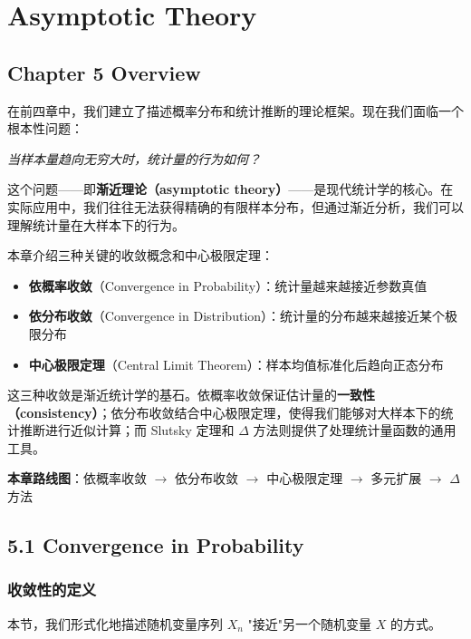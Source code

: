 \chapter{Asymptotic Theory}\label{chap:asymptotic-theory}

\section*{Chapter 5 Overview}

在前四章中，我们建立了描述概率分布和统计推断的理论框架。现在我们面临一个根本性问题：

\begin{center}
\textit{当样本量趋向无穷大时，统计量的行为如何？}
\end{center}

这个问题——即\textbf{渐近理论（asymptotic theory）}——是现代统计学的核心。在实际应用中，我们往往无法获得精确的有限样本分布，但通过渐近分析，我们可以理解统计量在大样本下的行为。

本章介绍三种关键的收敛概念和中心极限定理：

\begin{itemize}
\item \textbf{依概率收敛}（Convergence in Probability）：统计量越来越接近参数真值
\item \textbf{依分布收敛}（Convergence in Distribution）：统计量的分布越来越接近某个极限分布
\item \textbf{中心极限定理}（Central Limit Theorem）：样本均值标准化后趋向正态分布
\end{itemize}

这三种收敛是渐近统计学的基石。依概率收敛保证估计量的\textbf{一致性（consistency）}；依分布收敛结合中心极限定理，使得我们能够对大样本下的统计推断进行近似计算；而 Slutsky 定理和 $\Delta$ 方法则提供了处理统计量函数的通用工具。

\textbf{本章路线图}：依概率收敛 $\to$ 依分布收敛 $\to$ 中心极限定理 $\to$ 多元扩展 $\to$ $\Delta$ 方法

\section{5.1 Convergence in Probability}\label{sec:5.1}

\subsection{收敛性的定义}

本节，我们形式化地描述随机变量序列 ${X_n}$ "接近"另一个随机变量 $X$ 的方式。

